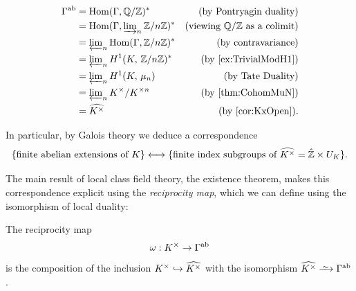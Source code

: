 \documentclass[a4paper, oneside]{memoir}
\begin{document}
\begin{align*}
    \Gamma^{\text{ab}} & = \operatorname{Hom}(\Gamma, \mathbb{Q}/\mathbb{Z})^*                              & \text{(by Pontryagin duality)}        \\
                       & = \operatorname{Hom}(\Gamma, \varinjlim_n\nolimits \mathbb{Z}/n\mathbb{Z})^*          & \text{(viewing $\mathbb{Q}/\mathbb{Z}$ as a colimit)} \\
                       & = \varprojlim_n\nolimits \operatorname{Hom}(\Gamma, \mathbb{Z}/n\mathbb{Z})^*         & \text{(by contravariance)}            \\
                       & = \varprojlim_n\nolimits H^{1}( K, \, \mathbb{Z}/n\mathbb{Z} )^*             & \text{(by \ref{ex:TrivialModH1})}     \\
                       & = \varprojlim_n\nolimits H^{1}( K, \, \mu_n )             & \text{(by Tate Duality)}              \\
                       & = \varprojlim_n\nolimits K^{\times} / K^{\times n} & \text{(by \ref{thm:CohomMuN})}        \\
                       & = \widehat{K^\times}                                & \text{(by \ref{cor:KxOpen})}.
\end{align*}

In particular, by Galois theory we deduce a correspondence
\[
    \{\text{finite abelian extensions of }K\} \longleftrightarrow \{\text{finite index subgroups of }\widehat{K^\times} = \hat{\mathbb{Z}} \times U_K\}
    .\]

The main result of local class field theory, the existence theorem, makes this correspondence explicit using the \textit{reciprocity map}, which we can define using the isomorphism of local duality:

\begin{definition}
    The reciprocity map
    \[
        \omega:K^\times \to \Gamma^{\text{ab}}
    \]
    is the composition of the inclusion $K^\times \hookrightarrow \widehat{K^\times}$ with the isomorphism $\widehat{\K^\times} \Iso \Gamma^{\text{ab}}$.
\end{definition}

\nocite{*}
\printbibliography
\end{document}
